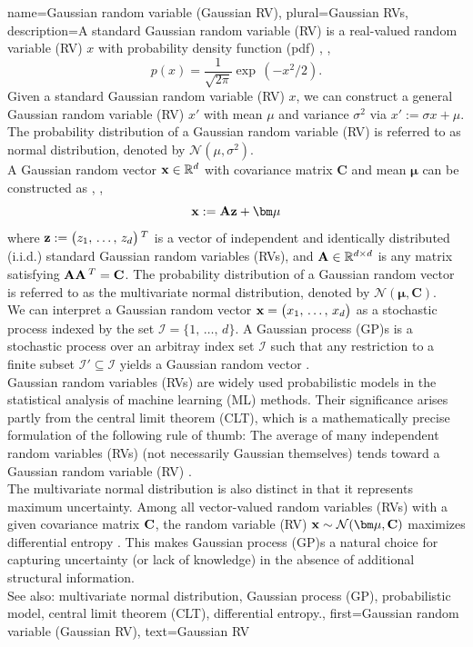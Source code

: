 {
{name={Gaussian random variable (Gaussian RV)}, 
	plural={Gaussian RVs}, 
	description={A  standard Gaussian random variable (RV) is a 
		real-valued random variable (RV) $x$ with probability density function (pdf) \cite{BertsekasProb}, \cite{GrayProbBook}, \cite{papoulis}
		\begin{equation}
			\nonumber
			p(x) = \frac{1}{\sqrt{2\pi}} \exp\,(-x^2/2). 
		\end{equation}
		Given a standard Gaussian random variable (RV) $x$, we can construct a general Gaussian random variable (RV) $x'$ with 
		mean $\mu$ and variance $\sigma^2$ via $x' := \sigma x + \mu$. The probability distribution of a 
		Gaussian random variable (RV) is referred to as normal distribution, denoted by $\mathcal{N}(\mu, \sigma^2)$. 
		\\ 
		A Gaussian random vector ${\bf x} \in \mathbb{R}^{d}$ with 
		covariance matrix $\mathbf{C}$ and mean ${\bm \mu}$ can be constructed as \cite{GrayProbBook}, \cite{papoulis}, \cite{Lapidoth09}
		\[
		{\bf x} := \mathbf{A} {\bf z} + {\bm \mu}
		\]
		where ${\bf z} := \big( z_{1}, \,\ldots, \,z_{d} \big)\,^{T}$ is a vector 
		of independent and identically distributed (i.i.d.) standard Gaussian random variables (RVs), and ${\bf A} \in \mathbb{R}^{d \times d}$ is any matrix satisfying ${\bf A} {\bf A}\,^{T} = {\bf C}$. 
		The probability distribution of a Gaussian random vector is referred to as the multivariate normal distribution, 
		denoted by $\mathcal{N}({\bm \mu}, \mathbf{C})$.
		\\
		We can interpret a Gaussian random vector ${\bf x}=\big(x_{1},\,\ldots,\,x_{d}\big)$ as a stochastic process 
		indexed by the set $\mathcal{I}=\{1,\,\ldots,\,d\}$. A Gaussian process (GP)s is a 
		stochastic process over an arbitray index set $\mathcal{I}$ such that any restriction to a finite subset 
		$\mathcal{I}' \subseteq \mathcal{I}$ yields a Gaussian random vector \cite{Rasmussen2006Gaussian}.
  		\\
        		Gaussian random variables (RVs) are widely used probabilistic models in the statistical analysis of 
        		machine learning (ML) methods. Their significance arises partly from the central limit theorem (CLT), which is a mathematically 
        		precise formulation of the following rule of thumb: The average of many independent random variables (RVs) 
		(not necessarily Gaussian themselves) tends toward a Gaussian random variable (RV) \cite{ross2013first}.
		\\ 
		The multivariate normal distribution is also distinct in that it represents maximum uncertainty. 
		Among all vector-valued random variables (RVs) with a given covariance matrix ${\bf C}$, the random variable (RV) ${\bf x} \sim \mathcal{N}({\bm \mu}, \mathbf{C})$ 
		maximizes differential entropy \cite[Th. 8.6.5]{coverthomas}. This makes Gaussian process (GP)s a 
		natural choice for capturing uncertainty (or lack of knowledge) in the absence of additional 
		structural information.
		\\ 
		See also: multivariate normal distribution, Gaussian process (GP), probabilistic model, central limit theorem (CLT), differential entropy.},
	first={Gaussian random variable (Gaussian RV)},
	text={Gaussian RV}
}
	
}
